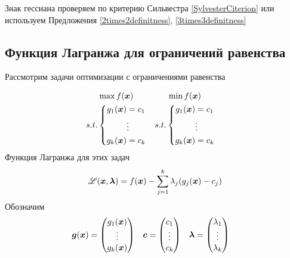 \begin{remark}
Знак гессиана проверяем по критерию Сильвестра 
\ref{SylvesterCiterion} или
используем Предложения \ref{2times2definitness}, \ref{3times3definitness}
\end{remark}


\subsection{Функция Лагранжа для ограничений равенства}

Рассмотрим задачи оптимизации с ограничениями равенства

\begin{align}\label{MaxMinEqualityConstraintOptmization}
	& \begin{gathered}
		\max f({\bm x}) \\
		s.t.\left\{\begin{aligned}
			g_1({\bm x})&=c_1 \\ &\vdots \\ g_k({\bm x})&=c_k
		\end{aligned}\right.
	\end{gathered} &
	& \begin{gathered}
		\min f({\bm x}) \\
		s.t.\left\{\begin{aligned}
			g_1({\bm x})&=c_1 \\ &\vdots \\ g_k({\bm x})&=c_k
		\end{aligned}\right.
	\end{gathered}
\end{align}
Функция Лагранжа для этих задач
\[
	{\mathscr L}({\bm x},{\bm{ \lambda}})=f({\bm x})-\sum_{j=1}^k \lambda_j(g_j({\bm x})-c_j)
\]
Обозначим
\begin{align*}
	{\bm g}({\bm x})&=\begin{pmatrix}
		g_1({\bm x}) \\ \vdots \\ g_k({\bm x})
	\end{pmatrix} & {\bm c}&=\begin{pmatrix}
		c_1 \\ \vdots \\ c_k
	\end{pmatrix} &
	{\bm{ \lambda}} &= \begin{pmatrix}
		\lambda_1 \\ \vdots \\ \lambda_k
	\end{pmatrix}
\end{align*} 

